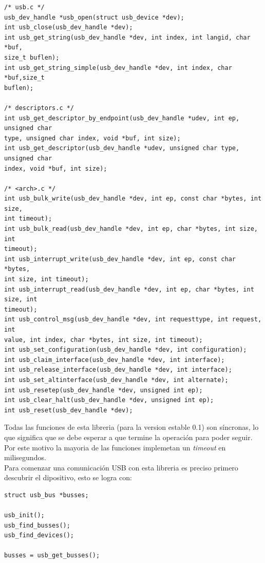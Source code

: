 \begin{lstlisting}
/* usb.c */
usb_dev_handle *usb_open(struct usb_device *dev);
int usb_close(usb_dev_handle *dev);
int usb_get_string(usb_dev_handle *dev, int index, int langid, char *buf,
size_t buflen);
int usb_get_string_simple(usb_dev_handle *dev, int index, char *buf,size_t
buflen);

/* descriptors.c */
int usb_get_descriptor_by_endpoint(usb_dev_handle *udev, int ep, unsigned char
type, unsigned char index, void *buf, int size);
int usb_get_descriptor(usb_dev_handle *udev, unsigned char type, unsigned char
index, void *buf, int size);

/* <arch>.c */
int usb_bulk_write(usb_dev_handle *dev, int ep, const char *bytes, int size,
int timeout);
int usb_bulk_read(usb_dev_handle *dev, int ep, char *bytes, int size, int
timeout);
int usb_interrupt_write(usb_dev_handle *dev, int ep, const char *bytes,
int size, int timeout);
int usb_interrupt_read(usb_dev_handle *dev, int ep, char *bytes, int size, int
timeout);
int usb_control_msg(usb_dev_handle *dev, int requesttype, int request, int
value, int index, char *bytes, int size, int timeout);
int usb_set_configuration(usb_dev_handle *dev, int configuration);
int usb_claim_interface(usb_dev_handle *dev, int interface);
int usb_release_interface(usb_dev_handle *dev, int interface);
int usb_set_altinterface(usb_dev_handle *dev, int alternate);
int usb_resetep(usb_dev_handle *dev, unsigned int ep);
int usb_clear_halt(usb_dev_handle *dev, unsigned int ep);
int usb_reset(usb_dev_handle *dev);
\end{lstlisting}


Todas las funciones de esta libreria (para la version estable 0.1) son
s\'incronas, lo que significa que se debe esperar a que termine la operaci\'on
para poder seguir. Por este motivo la mayoria de las funciones implemetan un
\emph{timeout} en milisegundos.\\



Para comenzar una comunicaci\'on USB con esta libreria es preciso primero
descubrir el dipositivo, esto se logra con:

\begin{lstlisting}
struct usb_bus *busses;
    
usb_init();
usb_find_busses();
usb_find_devices();
    
busses = usb_get_busses();
\end{lstlisting}

